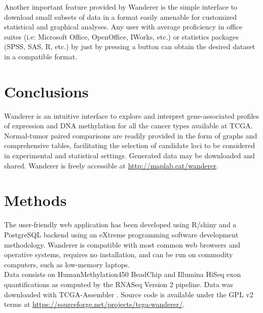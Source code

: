\documentclass{bmcart}
\begin{document}
Another important feature provided by Wanderer is the simple interface to download small subsets of data in a format easily amenable for customized statistical and graphical analyses. Any user with average proficiency in office suites (i.e: Microsoft Office, OpenOffice, IWorks, etc.) or statistics packages (SPSS, SAS, R, etc.) by just by pressing a button can obtain the desired dataset in a compatible format.\\

\section*{Conclusions}

Wanderer is an intuitive interface to explore and interpret gene-associated profiles of expression and DNA methylation for all the cancer types available at TCGA. Normal-tumor paired comparisons are readily provided in the form of graphs and comprehensive tables, facilitating the selection of candidate loci to be considered in experimental and statistical settings. Generated data may be downloaded and shared. Wanderer is freely accessible at \url{http://maplab.cat/wanderer}.\\



\section*{Methods}
The user-friendly web application has been developed using R/shiny and a PostgreSQL backend using an eXtreme programming software development methodology. Wanderer is compatible with most common web browsers and operative systems, requires no installation, and can be run on commodity computers, such as low-memory laptops.\\
 
Data consists on HumanMethylation450 BeadChip and Illumina HiSeq exon quantifications as computed by the RNASeq Version 2 pipeline. Data was downloaded with TCGA-Assembler \cite{zhu2014tcga}. Source code is available under the GPL v2 terms at \url{https://sourceforge.net/projects/tcga-wanderer/}.







\end{document}
